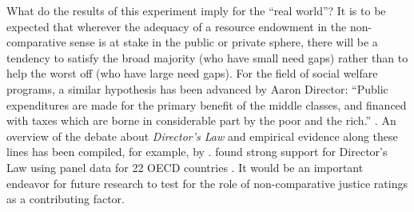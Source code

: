 \documentclass[12pt]{scrartcl}
\begin{document}
What do the results of this experiment imply for the ``real world''?
It is to be expected that wherever the adequacy of a resource endowment in the non-comparative sense is at stake in the public or private sphere, there will be a tendency to satisfy the broad majority (who have small need gaps) rather than to help the worst off (who have large need gaps).
For the field of social welfare programs, a similar hypothesis has been advanced by Aaron Director: ``Public expenditures are made for the primary benefit of the middle classes, and financed with taxes which are borne in considerable part by the poor and the rich.'' \cite[p.~1]{stigler_directors_1970}.
An overview of the debate about \textit{Director's Law} and empirical evidence along these lines has been compiled, for example, by \citet{feld_still_2007}.
\citet{pamp_soaking_2010} found strong support for Director's Law using panel data for 22 OECD countries \citep[see also][]{larch_mitigating_2020}.
It would be an important endeavor for future research to test for the role of non-comparative justice ratings as a contributing factor.


\newpage




\newpage
\appendix


\end{document}

